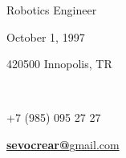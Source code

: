 \documentclass[]{friggeri-cv_reccius-experiment}
\begin{document}
      {Robotics Engineer}
      
\vspace{0.3cm}   
\color{lightgray}\noindent\makebox[\textwidth]{\rule{\paperwidth-0.4cm}{2.5pt}}


\begin{info}
    \begin{flushleft}
    {{\hfill{\LARGE \textborn\thinspace\thinspace\verythinspace\hspace{14mm}}\small October 1, 1997}\\
    
    \vspace{0.11cm}
    
    \small \hfill{\Large\faMapMarker\thinspace\thinspace\thinspace\hspace{5mm}} 420500 Innopolis, TR}\
    
    \vspace{0.11cm}
    
    \hfill{\LARGE\Mobilefone\thinspace\hspace{9mm}}{\small +7 (985) 095 27 27}\\

    \vspace{0.11cm}
    
    \hfill{\Large\Letter}\hspace{0.5mm}{\small \faMousePointer  }\hspace{3mm}\href{mailto:sevocrear@gmail.com}{{\small\textbf{sevocrear@}gmail.com}}\\
    
    \end{flushleft}
\end{info}
\end{document}
